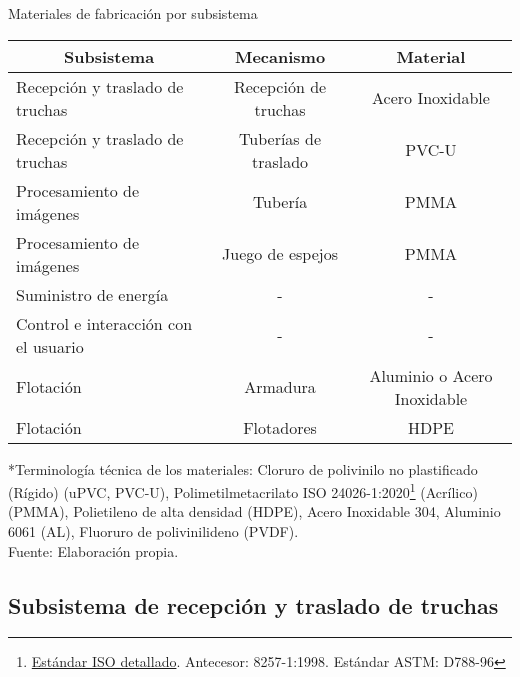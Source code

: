 \begin{savenotes}
\begin{mytable}[H]
	\centering
	\caption{Materiales de fabricación por subsistema}
	\label{tab:materiales de fabricacion por subsistema}
	\begin{tabular}{|l|c|c|}
		\hline
		\multicolumn{1}{|c|}{\textbf{Subsistema}} & \multicolumn{1}{c|}{\textbf{Mecanismo}} & \textbf{Material} \\ \hline
		Recepción y traslado de truchas      & Recepción de truchas   & Acero Inoxidable            \\ \hline
		Recepción y traslado de truchas      & Tuberías de traslado   & PVC-U                         \\ \hline
		Procesamiento de imágenes            & Tubería                & PMMA  \\ \hline
		Procesamiento de imágenes            & Juego de espejos       & PMMA  \\ \hline
		Suministro de energía                & \multicolumn{1}{c|}{-} & -                           \\ \hline
		Control e interacción con el usuario & \multicolumn{1}{c|}{-} & -                           \\ \hline
		Flotación                            & Armadura               & Aluminio o Acero Inoxidable \\ \hline
		Flotación                            & Flotadores             & HDPE                         \\ \hline
	\end{tabular}
	\begin{flushleft}
	*Terminología técnica de los materiales: Cloruro de polivinilo no plastificado (Rígido) (uPVC, PVC-U), Polimetilmetacrilato ISO 24026-1:2020\footnote{\href{https://www.iso.org/standard/77547.html}{Estándar ISO detallado}. Antecesor: 8257-1:1998. Estándar ASTM: D788-96} (Acrílico) (PMMA), Polietileno de alta densidad (HDPE), Acero Inoxidable 304, Aluminio 6061 (AL), Fluoruro de polivinilideno (PVDF).\\	
	Fuente: Elaboración propia.
	\end{flushleft}
\end{mytable}
\end{savenotes}

\subsection{Subsistema de recepción y traslado de truchas}
\label{ssec:subsistema de recepcion y traslado de truchas}

